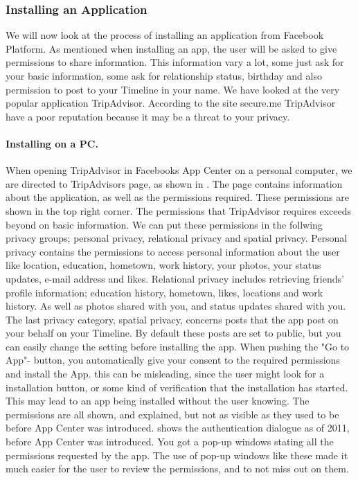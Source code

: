 \subsubsection{Installing an Application}
We will now look at the process of installing an application from Facebook Platform. As mentioned when installing an app, the user will be asked to give permissions to share information. This information vary a lot, some just ask for your basic information, some ask for relationship status, birthday and also permission to post to your Timeline in your name. We have looked at the very popular application TripAdvisor. According to the site secure.me \cite{secure.me} TripAdvisor have a poor reputation because it may be a threat to your privacy.  

\paragraph{Installing on a PC.}
When opening TripAdvisor in Facebooks App Center on a personal computer, we are directed to TripAdvisors page, as shown in . The page contains information about the application, as well as the permissions required. These permissions are shown in the top right corner. The permissions that TripAdvisor requires exceeds beyond on basic information. We can put these permissions in the follwing privacy groups; personal privacy, relational privacy and spatial privacy. Personal privacy contains the permissions to access personal information about the user like location, education, hometown, work history, your photos, your status updates, e-mail address and likes. Relational privacy includes retrieving friends' profile information; education history, hometown, likes, locations and work history. As well as photos shared with you, and status updates shared with you. The last privacy category, spatial privacy, concerns posts that the app post on your behalf on your Timeline. By default these posts are set to public, but you can easily change the setting before installing the app. When pushing the "Go to App"- button, you automatically give your consent to the required permissions and install the App. this can be misleading, since the user might look for a installation button, or some kind of verification that the installation has started. This may lead to an app being installed without the user knowing. The permissions are all shown, and explained, but not as visible as they used to be before App Center was introduced.  shows the authentication dialogue as of 2011, before App Center was introduced. You got a pop-up windows stating all the permissions requested by the app. The use of pop-up windows like these made it much easier for the user to review the permissions, and to not miss out on them. 

